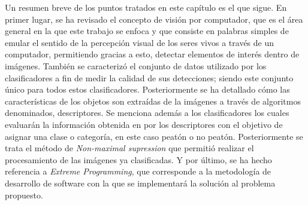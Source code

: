 Un resumen breve de los puntos tratados en este capítulo es el que sigue. En primer lugar, se ha revisado el concepto de visión por computador, que es el área general en la que este trabajo se enfoca y que consiste en palabras simples de emular el sentido de la percepción visual de los seres vivos a través de un computador, permitiendo gracias a esto, detectar elementos de interés dentro de imágenes. También se caracterizó el conjunto de datos utilizado por los clasificadores a fin de medir la calidad de sus detecciones; siendo este conjunto único para todos estos clasificadores. Posteriormente se ha detallado cómo las características de los objetos son extraídas de la imágenes a través de algoritmos denominados, descriptores. Se menciona además a los clasificadores los cuales evaluarán la información obtenida en por los descriptores con el objetivo de asignar una clase o categoría, en este caso peatón o no peatón. Posteriormente se trata el método de \textit{Non-maximal supression} que permitió realizar el procesamiento de las imágenes ya clasificadas. Y por último, se ha hecho referencia a \textit{Extreme Programming}, que corresponde a la metodología de desarrollo de software con la que se implementará la solución al problema propuesto.




